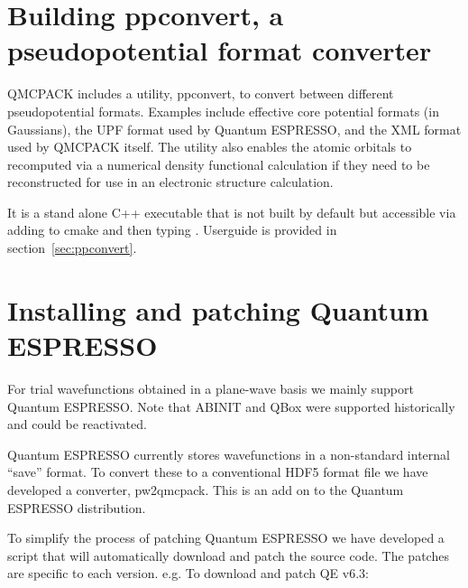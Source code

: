 \section{Building ppconvert, a pseudopotential format converter}
\label{sec:buildppconvert}
QMCPACK includes a utility, ppconvert, to convert between different
pseudopotential formats. Examples include effective core potential
formats (in Gaussians), the UPF format used by Quantum ESPRESSO, and
the XML format used by QMCPACK itself. The utility also enables the
atomic orbitals to recomputed via a numerical density functional
calculation if they need to be reconstructed for use in an
electronic structure calculation.

It is a stand alone C++ executable that is not built by default but accessible via adding
 to cmake and then typing .
Userguide is provided in section~\ref{sec:ppconvert}.

\section{Installing and patching Quantum ESPRESSO}
\label{sec:buildqe}
For trial wavefunctions obtained in a plane-wave basis we mainly
support Quantum ESPRESSO. Note that ABINIT and QBox were supported historically
and could be reactivated.

Quantum ESPRESSO currently stores wavefunctions in a non-standard internal
``save'' format. To convert these to a conventional HDF5 format file
we have developed a converter, pw2qmcpack. This is an add on to the
Quantum ESPRESSO distribution.

To simplify the process of patching Quantum ESPRESSO we have developed
a script that will automatically download and patch the source
code. The patches are specific to each version. e.g. To download and
patch QE v6.3:

